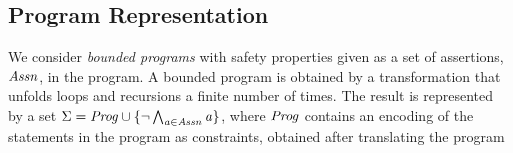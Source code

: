 \subsection{Program Representation}\label{sec:program}  
%
%
We consider \emph{bounded programs} with safety
properties given as a set of assertions, $\mathit{Assn}$, in the program.
%
A bounded program is obtained by a transformation that unfolds
loops and recursions a finite number of times. The result 
is represented by a set
$\Sigma=\mathit{Prog}\cup\{\neg \bigwedge_{\mathit{a}\in\mathit{Assn}} \mathit{a}\}$,
where $\mathit{Prog}$ contains an encoding of the statements in the program as
constraints, obtained after translating the program
